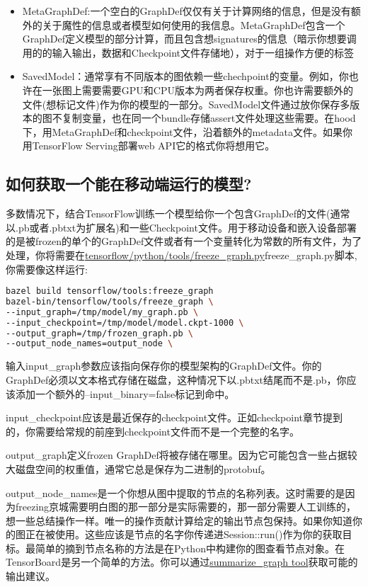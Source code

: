 \begin{itemize}
\item MetaGraphDef:一个空白的GraphDef仅仅有关于计算网络的信息，但是没有额外的关于魔性的信息或者模型如何使用的我信息。MetaGraphDef包含一个GraphDef定义模型的部分计算，而且包含想signatures的信息（暗示你想要调用的的输入输出，数据和Checkpoint文件存储地），对于一组操作方便的标签
\item SavedModel：通常享有不同版本的图依赖一些chechpoint的变量。例如，你也许在一张图上需要需要GPU和CPU版本为两者保存权重。你也许需要额外的文件(想标记文件)作为你的模型的一部分。SavedModel文件通过放你保存多版本的图不复制变量，也在同一个bundle存储assert文件处理这些需要。在hood下，用MetaGraphDef和checkpoint文件，沿着额外的metadata文件。如果你用TensorFlow Serving部署web API它的格式你将想用它。
\end{itemize}
\subsection{如何获取一个能在移动端运行的模型?}
多数情况下，结合TensorFlow训练一个模型给你一个包含GraphDef的文件(通常以.pb或者.pbtxt为扩展名)和一些Checkpoint文件。用于移动设备和嵌入设备部署的是被frozen的单个的GraphDef文件或者有一个变量转化为常数的所有文件，为了处理，你将需要在\href{https://www.github.com/tensorflow/tensorflow/blob/r1.4/tensorflow/python/tools/freeze_graph.py}{tensorflow/python/tools/freeze\_graph.py}freeze\_graph.py脚本,你需要像这样运行:
\begin{lstlisting}[language=Bash]
bazel build tensorflow/tools:freeze_graph
bazel-bin/tensorflow/tools/freeze_graph \
--input_graph=/tmp/model/my_graph.pb \
--input_checkpoint=/tmp/model/model.ckpt-1000 \
--output_graph=/tmp/frozen_graph.pb \
--output_node_names=output_node \
\end{lstlisting}
输入input\_graph参数应该指向保存你的模型架构的GraphDef文件。你的GraphDef必须以文本格式存储在磁盘，这种情况下以.pbtxt结尾而不是.pb，你应该添加一个额外的--input\_binary=false标记到命中。

input\_checkpoint应该是最近保存的checkpoint文件。正如checkpoint章节提到的，你需要给常规的前座到checkpoint文件而不是一个完整的名字。

output\_graph定义frozen GraphDef将被存储在哪里。因为它可能包含一些占据较大磁盘空间的权重值，通常它总是保存为二进制的protobuf。

output\_node\_names是一个你想从图中提取的节点的名称列表。这时需要的是因为freezing京城需要明白图的那一部分是实际需要的，那一部分需要人工训练的，想一些总结操作一样。唯一的操作贡献计算给定的输出节点包保持。如果你知道你的图正在被使用。这些应该是节点的名字你传递进Session::run()作为你的获取目标。最简单的摘到节点名称的方法是在Python中构建你的图查看节点对象。在TensorBoard是另一个简单的方法。你可以通过\href{https://github.com/tensorflow/tensorflow/tree/master/tensorflow/tools/graph_transforms/README#inspecting-graphs}{summarize\_graph tool}获取可能的输出建议。

